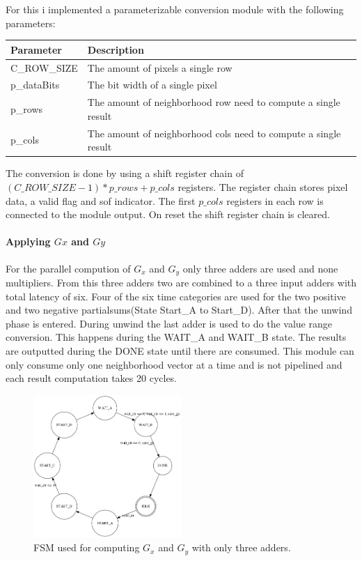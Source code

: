 \documentclass[a4paper,fontsize=12pt]{scrartcl}
\begin{document}
For this i implemented a parameterizable conversion module with the following parameters:
\begin{table}[h]
\begin{tabularx}{\textwidth}{|l|X|}
\hline
\textbf{Parameter} & \textbf{Description} \\ \hline
\hline
C\_ROW\_SIZE & The amount of pixels a single row \\ \hline
p\_dataBits  & The bit width of a single pixel \\ \hline
p\_rows      & The amount of neighborhood row need to compute a single result \\ \hline
p\_cols      & The amount of neighborhood cols need to compute a single result \\ \hline
\end{tabularx}
\end{table}


The conversion is done by using a shift register chain of $(C\_ROW\_SIZE-1)*p\_rows+p\_cols$ registers. The register chain stores pixel data, a valid flag and sof indicator. The first $p\_cols$ registers in each row is connected to the module output. On reset the shift register chain is cleared.

\paragraph{Applying $Gx$ and $Gy$}
For the parallel  compution of $G_x$ and $G_y$ only three adders are used and none multipliers. From this three adders two are combined to a three input adders with total latency of six. Four of the six time categories are used for the two positive and two negative partialsums(State Start\_A to Start\_D).  After that the unwind phase is entered. During unwind the last adder is used to do the value range conversion. This happens during the WAIT\_A and WAIT\_B state. The results are outputted during the DONE state until there are consumed. This module can only consume only one neighborhood vector at a time and is not pipelined and each result computation takes 20 cycles.
\begin{figure}[h]
  \centering
  \includegraphics[width=0.5\textwidth]{circofsm.png} 
  \caption{FSM used for computing $G_x$ and $G_y$ with only three adders.}
\end{figure}
\end{document}
